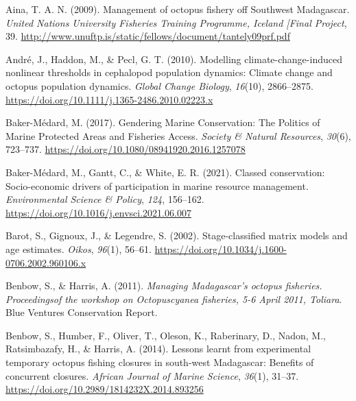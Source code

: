 \documentclass[
]{article}
\newlength{\cslhangindent}
\newlength{\cslentryspacingunit} %
\newenvironment{CSLReferences}[2] %
 {%
  \setlength{\parindent}{0pt}
  \ifodd #1
  \let\oldpar\par
  \def\par{\hangindent=\cslhangindent\oldpar}
  \fi
  \setlength{\parskip}{#2\cslentryspacingunit}
 }%
 {}
\begin{document}
\hypertarget{refs}{}
\begin{CSLReferences}{1}{2}
\leavevmode{}%
Aina, T. A. N. (2009). Management of octopus fishery off {Southwest} {Madagascar}. \emph{United Nations University Fisheries Training Programme, Iceland {[}Final Project}, 39. \url{http://www.unuftp.is/static/fellows/document/tantely09prf.pdf}

\leavevmode{}%
André, J., Haddon, M., \& Pecl, G. T. (2010). Modelling climate-change-induced nonlinear thresholds in cephalopod population dynamics: {Climate} change and octopus population dynamics. \emph{Global Change Biology}, \emph{16}(10), 2866--2875. \url{https://doi.org/10.1111/j.1365-2486.2010.02223.x}

\leavevmode{}%
Baker-Médard, M. (2017). Gendering {Marine} {Conservation}: {The} {Politics} of {Marine} {Protected} {Areas} and {Fisheries} {Access}. \emph{Society \& Natural Resources}, \emph{30}(6), 723--737. \url{https://doi.org/10.1080/08941920.2016.1257078}

\leavevmode{}%
Baker-Médard, M., Gantt, C., \& White, E. R. (2021). Classed conservation: {Socio}-economic drivers of participation in marine resource management. \emph{Environmental Science \& Policy}, \emph{124}, 156--162. \url{https://doi.org/10.1016/j.envsci.2021.06.007}

\leavevmode{}%
Barot, S., Gignoux, J., \& Legendre, S. (2002). Stage-classified matrix models and age estimates. \emph{Oikos}, \emph{96}(1), 56--61. \url{https://doi.org/10.1034/j.1600-0706.2002.960106.x}

\leavevmode{}%
Benbow, S., \& Harris, A. (2011). \emph{Managing {Madagascar}'s octopus fisheries. {Proceedingsof} the workshop on {Octopuscyanea} fisheries, 5-6 {April} 2011, {Toliara}}. Blue Ventures Conservation Report.

\leavevmode{}%
Benbow, S., Humber, F., Oliver, T., Oleson, K., Raberinary, D., Nadon, M., Ratsimbazafy, H., \& Harris, A. (2014). Lessons learnt from experimental temporary octopus fishing closures in south-west {Madagascar}: Benefits of concurrent closures. \emph{African Journal of Marine Science}, \emph{36}(1), 31--37. \url{https://doi.org/10.2989/1814232X.2014.893256}


\end{CSLReferences}
\end{document}
